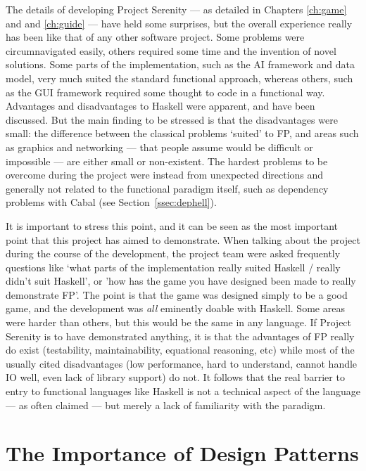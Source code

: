 The details of developing Project Serenity --- as detailed in Chapters \ref{ch:game} and and \ref{ch:guide} --- have held some surprises, but the overall experience really has been like that of any other software project. Some problems were circumnavigated easily, others required some time and the invention of novel solutions. Some parts of the implementation, such as the AI framework and data model, very much suited the standard functional approach, whereas others, such as the GUI framework required some thought to code in a functional way. Advantages and disadvantages to Haskell were apparent, and have been discussed. But the main finding to be stressed is that the disadvantages were small: the difference between the classical problems `suited' to FP, and areas such as graphics and networking --- that people assume would be difficult or impossible --- are either small or non-existent. The hardest problems to be overcome during the project were instead from unexpected directions and generally not related to the functional paradigm itself, such as dependency problems with Cabal (see Section~\ref{ssec:dephell}).

It is important to stress this point, and it can be seen as the most important point that this project has aimed to demonstrate. When talking about the project during the course of the development, the project team were asked frequently questions like `what parts of the implementation really suited Haskell / really didn't suit Haskell', or 'how has the game you have designed been made to really demonstrate FP'. The point is that the game was designed simply to be a good game, and the development was \emph{all} eminently doable with Haskell. Some areas were harder than others, but this would be the same in any language. If Project Serenity is to have demonstrated anything, it is that the advantages of FP really do exist (testability, maintainability, equational reasoning, etc) while most of the usually cited disadvantages (low performance, hard to understand, cannot handle IO well, even lack of library support) do not. It follows that the real barrier to entry to functional languages like Haskell is not a technical aspect of the language --- as often claimed --- but merely a lack of familiarity with the paradigm.

\section{The Importance of Design Patterns}

